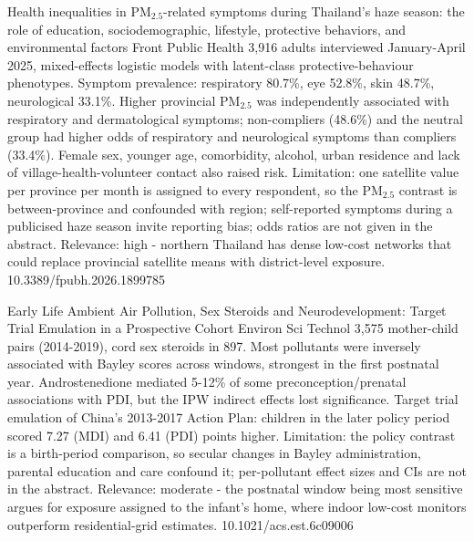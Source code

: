 \documentclass[10pt]{article}
\begin{document}
\par{}\baselineskip{}\baselineskip
{}

{Health inequalities in PM$_{2.5}$-related symptoms during Thailand's haze season: the role of education, sociodemographic, lifestyle, protective behaviors, and environmental factors}
{Front Public Health}
{3,916 adults interviewed January-April 2025, mixed-effects logistic models with latent-class protective-behaviour phenotypes. Symptom prevalence: respiratory 80.7\%, eye 52.8\%, skin 48.7\%, neurological 33.1\%. Higher provincial PM$_{2.5}$ was independently associated with respiratory and dermatological symptoms; non-compliers (48.6\%) and the neutral group had higher odds of respiratory and neurological symptoms than compliers (33.4\%). Female sex, younger age, comorbidity, alcohol, urban residence and lack of village-health-volunteer contact also raised risk. Limitation: one satellite value per province per month is assigned to every respondent, so the PM$_{2.5}$ contrast is between-province and confounded with region; self-reported symptoms during a publicised haze season invite reporting bias; odds ratios are not given in the abstract. Relevance: high - northern Thailand has dense low-cost networks that could replace provincial satellite means with district-level exposure.}
{10.3389/fpubh.2026.1899785}

\par{}\baselineskip{}\baselineskip
{}

{Early Life Ambient Air Pollution, Sex Steroids and Neurodevelopment: Target Trial Emulation in a Prospective Cohort}
{Environ Sci Technol}
{3,575 mother-child pairs (2014-2019), cord sex steroids in 897. Most pollutants were inversely associated with Bayley scores across windows, strongest in the first postnatal year. Androstenedione mediated 5-12\% of some preconception/prenatal associations with PDI, but the IPW indirect effects lost significance. Target trial emulation of China's 2013-2017 Action Plan: children in the later policy period scored 7.27 (MDI) and 6.41 (PDI) points higher. Limitation: the policy contrast is a birth-period comparison, so secular changes in Bayley administration, parental education and care confound it; per-pollutant effect sizes and CIs are not in the abstract. Relevance: moderate - the postnatal window being most sensitive argues for exposure assigned to the infant's home, where indoor low-cost monitors outperform residential-grid estimates.}
{10.1021/acs.est.6c09006}
\end{document}
